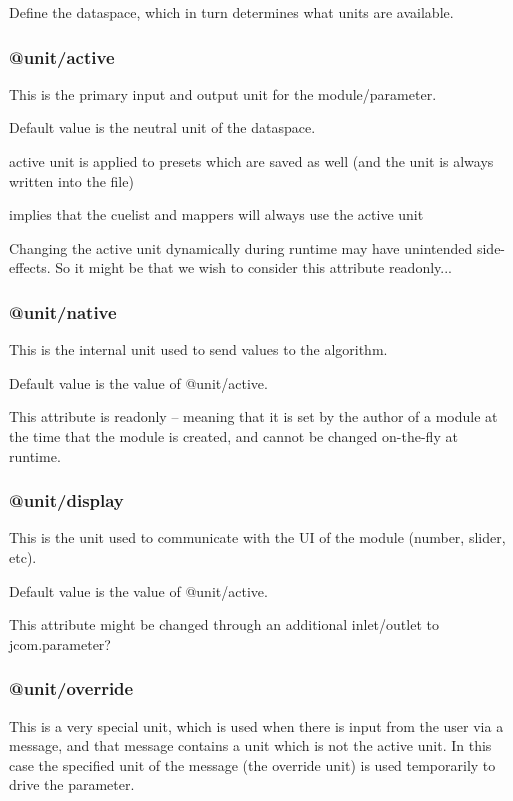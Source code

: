 \documentclass[]{article}
\begin{document}
Define the dataspace, which in turn determines what units are available.




\subsubsection{@unit/active}

This is the primary input and output unit for the module/parameter.

Default value is the neutral unit of the dataspace.

active unit is applied to presets which are saved as well 
  (and the unit is always written into the file)

implies that the cuelist and mappers will always use the active unit

Changing the active unit dynamically during runtime may have unintended side-effects.  So it might be that we wish to consider this attribute readonly...


\subsubsection{@unit/native}

This is the internal unit used to send values to the algorithm.

Default value is the value of @unit/active.

This attribute is readonly -- meaning that it is set by the author of a module at the time that the module is created, and cannot be changed on-the-fly at runtime.


\subsubsection{@unit/display}

This is the unit used to communicate with the UI of the module (number, slider, etc).

Default value is the value of @unit/active.

This attribute might be changed through an additional inlet/outlet to jcom.parameter?


\subsubsection{@unit/override}

This is a very special unit, which is used when there is input from the user via a message, and that message contains a unit which is not the active unit.  In this case the specified unit of the message (the override unit) is used temporarily to drive the parameter.
\end{document}
